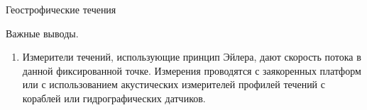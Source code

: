\begin{chapter}{Геострофические течения}
\begin{section}{Важные выводы.}
\begin{enumerate}
\item
Измерители течений, использующие принцип Эйлера, дают скорость потока
в данной фиксированной точке. Измерения проводятся с заякоренных
платформ или с использованием акустических измерителей профилей
течений с кораблей или гидрографических датчиков.
%
\end{enumerate}
\end{section}

\end{chapter}